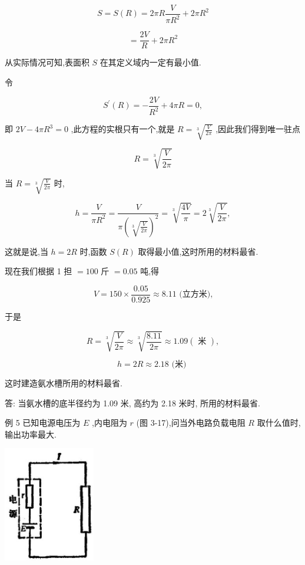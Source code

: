 \documentclass[10pt]{article}
\begin{document}
\[
S = S\left( R\right) = {2\pi R}\frac{V}{\pi {R}^{2}} + {2\pi }{R}^{2}
\]

\[
= \frac{2V}{R} + {2\pi }{R}^{2}
\]

从实际情况可知,表面积 \(S\) 在其定义域内一定有最小值.

令

\[
{S}^{\prime }\left( R\right) = - \frac{2V}{{R}^{2}} + {4\pi R} = 0,
\]

即 \({2V} - {4\pi }{R}^{3} = 0\) ,此方程的实根只有一个,就是 \(R = \sqrt[3]{\frac{V}{2\pi }}\) ,因此我们得到唯一驻点

\[
R = \sqrt[3]{\frac{V}{2\pi }}
\]

当 \(R = \sqrt[3]{\frac{V}{2\pi }}\) 时,

\[
h = \frac{V}{\pi {R}^{2}} = \frac{V}{\pi {\left( \sqrt[3]{\frac{V}{2\pi }}\right) }^{2}} = \sqrt[3]{\frac{4V}{\pi }} = 2\sqrt[3]{\frac{V}{2\pi }},
\]

这就是说,当 \(h = {2R}\) 时,函数 \(S\left( R\right)\) 取得最小值,这时所用的材料最省.

现在我们根据 1 担 \(= {100}\) 斤 \(= {0.05}\) 吨,得

\[
V = {150} \times \frac{0.05}{0.925} \approx {8.11}\text{ (立方米),}
\]

于是

\[
R = \sqrt[3]{\frac{V}{2\pi }} \approx \sqrt[3]{\frac{8.11}{2\pi }} \approx {1.09}\left( \text{ 米 }\right) ,
\]

\[
h = {2R} \approx {2.18}\text{ (米) }
\]

这时建造氨水槽所用的材料最省.

答: 当氨水槽的底半径约为 1.09 米, 高约为 2.18 米时, 所用的材料最省.

例 5 已知电源电压为 \(E\) ,内电阻为 \(r\) (图 3-17),问当外电路负载电阻 \(R\) 取什么值时,输出功率最大.

\begin{center}
\includegraphics[max width=0.3\textwidth]{images/01912c18-5c3f-733d-b775-749ba9897a9d_152_349261.jpg}
\end{center}
\end{document}
